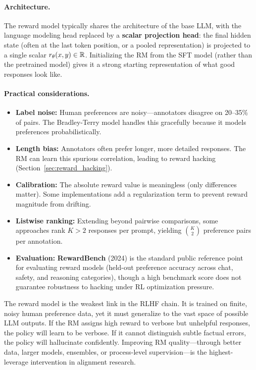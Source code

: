 \paragraph{Architecture.}
The reward model typically shares the architecture of the base LLM, with the
language modeling head replaced by a \textbf{scalar projection head}: the
final hidden state (often at the last token position, or a pooled
representation) is projected to a single scalar $r_\theta(x, y) \in \mathbb{R}$.
Initializing the RM from the SFT model (rather than the pretrained model)
gives it a strong starting representation of what good responses look like.

\paragraph{Practical considerations.}
\begin{itemize}[leftmargin=*]
\item \textbf{Label noise:} Human preferences are noisy---annotators
  disagree on 20--35\% of pairs.  The Bradley-Terry model handles this
  gracefully because it models preferences probabilistically.
\item \textbf{Length bias:} Annotators often prefer longer, more detailed
  responses.  The RM can learn this spurious correlation, leading to
  reward hacking (Section~\ref{sec:reward_hacking}).
\item \textbf{Calibration:} The absolute reward value is meaningless (only
  differences matter).  Some implementations add a regularization term to
  prevent reward magnitude from drifting.
\item \textbf{Listwise ranking:} Extending beyond pairwise comparisons,
  some approaches rank $K > 2$ responses per prompt, yielding
  $\binom{K}{2}$ preference pairs per annotation.
\item \textbf{Evaluation:} \textbf{RewardBench} (2024) is the standard
  public reference point for evaluating reward models (held-out
  preference accuracy across chat, safety, and reasoning categories),
  though a high benchmark score does not guarantee robustness to hacking
  under RL optimization pressure.
\end{itemize}

\begin{keyinsight}
The reward model is the weakest link in the RLHF chain.  It is trained on
finite, noisy human preference data, yet it must generalize to the vast
space of possible LLM outputs.  If the RM assigns high reward to verbose
but unhelpful responses, the policy will learn to be verbose.  If it
cannot distinguish subtle factual errors, the policy will hallucinate
confidently.  Improving RM quality---through better data, larger models,
ensembles, or process-level supervision---is the highest-leverage
intervention in alignment research.
\end{keyinsight}


